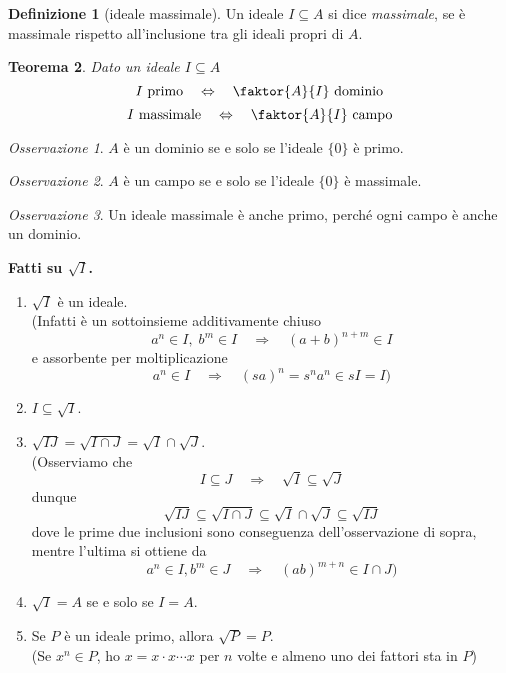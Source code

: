 \documentclass[a4paper]{article}
\newtheorem{theorem}{Teorema}[section]
\theoremstyle{remark}
\newtheorem*{remark}{Osservazione}
\theoremstyle{definition}
\newtheorem{definition}[theorem]{Definizione}
\begin{document}
\begin{multicols}{2}
\begin{definition}[ideale massimale]
	Un ideale $ I \subseteq A $ si dice \emph{massimale}, se è massimale rispetto all'inclusione tra gli ideali propri di $ A $.
\end{definition}

\begin{theorem}
	Dato un ideale $ I \subseteq A $
	\[ I \text{ primo} \quad\Leftrightarrow\quad \faktor{A}{I} \text{ dominio} \]
	\[ I \text{ massimale} \quad\Leftrightarrow\quad \faktor{A}{I} \text{ campo} \]
\end{theorem}

\begin{remark}
	$ A $ è un dominio se e solo se l'ideale $ \{0\} $ è primo.
\end{remark}
\begin{remark}
	$ A $ è un campo se e solo se l'ideale $ \{0\} $ è massimale.
\end{remark}
\begin{remark}
	Un ideale massimale è anche primo, perché ogni campo è anche un dominio.
\end{remark}

\textbf{Fatti su $ \sqrt{I} $.}
\begin{enumerate}
	\item $ \sqrt{I} $ è un ideale. \\ (Infatti è un sottoinsieme additivamente chiuso
	\[ a^n \in I,\;  b^m \in I \quad\Rightarrow\quad (a+b)^{n+m} \in I \]
	e assorbente per moltiplicazione
	\[ a^n \in I \quad\Rightarrow\quad (sa)^{n} = s^na^n \in sI = I ) \]
	
	\item $ I \subseteq \sqrt{I} $.
	\item $ \sqrt{IJ} = \sqrt{I \cap J} = \sqrt{I} \cap \sqrt{J} $. \\ (Osserviamo che
	\[ I \subseteq J \quad\Rightarrow\quad \sqrt{I} \subseteq \sqrt{J} \]
	dunque 
	\[ \sqrt{IJ} \subseteq \sqrt{I \cap J} \subseteq \sqrt{I} \cap \sqrt{J} \subseteq \sqrt{IJ} \]
	dove le prime due inclusioni sono conseguenza dell'osservazione di sopra, mentre l'ultima si ottiene da
	\[ a^n \in I, b^m \in J \quad\Rightarrow\quad (ab)^{m + n} \in I \cap J )\]
	
	\item $ \sqrt{I} = A $ se e solo se $ I = A $.
	\item Se $ P $ è un ideale primo, allora $ \sqrt{P} = P $. \\ 
	(Se $ x^n \in P $, ho $ x = x \cdot x \cdots x $ per $ n $ volte e almeno uno dei fattori sta in $ P $)
	

\end{enumerate}
\end{multicols}
\end{document}
